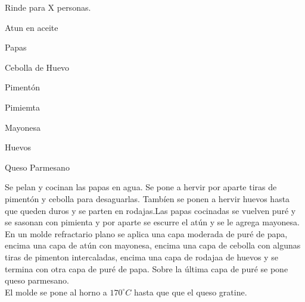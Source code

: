 
Rinde para X personas.\\

\begin{ingredientes}
\item Atun en aceite
\item Papas
\item Cebolla de Huevo
\item Pimentón
\item Pimiemta
\item Mayonesa
\item Huevos
\item Queso Parmesano
\end{ingredientes}
\preparacion

Se pelan y cocinan las papas en agua. Se pone a hervir por aparte tiras de pimentón y cebolla para desaguarlas. Tambíen se ponen a hervir huevos hasta que queden duros y se parten en rodajas.Las papas cocinadas se vuelven puré y se sasonan con pimienta y por aparte se escurre el atún y se le agrega mayonesa.\\

En un molde refractario plano se aplica una capa moderada de puré de papa, encima una capa de atún con mayonesa, encima una capa de cebolla con algunas tiras de pimenton intercaladas, encima una capa de rodajaa de huevos y se termina con otra capa de puré de papa. Sobre la última capa de puré se pone queso parmesano.\\

El molde se pone al horno a $170^{\circ}C$ hasta que que el queso gratine.
